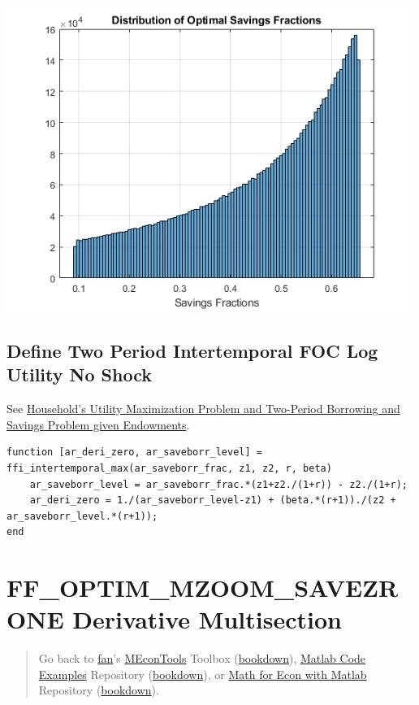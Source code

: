 \documentclass[
]{book}
\begin{document}
\includegraphics[width=5.20833in,height=\textheight]{img/fx_optim_mlsec_savezrone_images/figure_2.png}

\hypertarget{define-two-period-intertemporal-foc-log-utility-no-shock-1}{%
\subsection{Define Two Period Intertemporal FOC Log Utility No Shock}\label{define-two-period-intertemporal-foc-log-utility-no-shock-1}}

See \href{https://fanwangecon.github.io/Math4Econ/derivative_application/htmlpdfm/K_save_households.html}{Household's Utility Maximization Problem and Two-Period Borrowing
and Savings Problem given
Endowments}.

\begin{verbatim}
function [ar_deri_zero, ar_saveborr_level] = ffi_intertemporal_max(ar_saveborr_frac, z1, z2, r, beta)
    ar_saveborr_level = ar_saveborr_frac.*(z1+z2./(1+r)) - z2./(1+r);
    ar_deri_zero = 1./(ar_saveborr_level-z1) + (beta.*(r+1))./(z2 + ar_saveborr_level.*(r+1));
end
\end{verbatim}

\hypertarget{ff_optim_mzoom_savezrone-derivative-multisection}{%
\section{FF\_OPTIM\_MZOOM\_SAVEZRONE Derivative Multisection}\label{ff_optim_mzoom_savezrone-derivative-multisection}}

\begin{quote}
Go back to \href{http://fanwangecon.github.io/}{fan}'s \href{https://fanwangecon.github.io/MEconTools/}{MEconTools} Toolbox (\href{https://fanwangecon.github.io/MEconTools/bookdown}{bookdown}), \href{https://fanwangecon.github.io/M4Econ/}{Matlab Code Examples} Repository (\href{https://fanwangecon.github.io/M4Econ/bookdown}{bookdown}), or \href{https://fanwangecon.github.io/Math4Econ/}{Math for Econ with Matlab} Repository (\href{https://fanwangecon.github.io/Math4Econ/bookdown}{bookdown}).
\end{quote}
\end{document}

